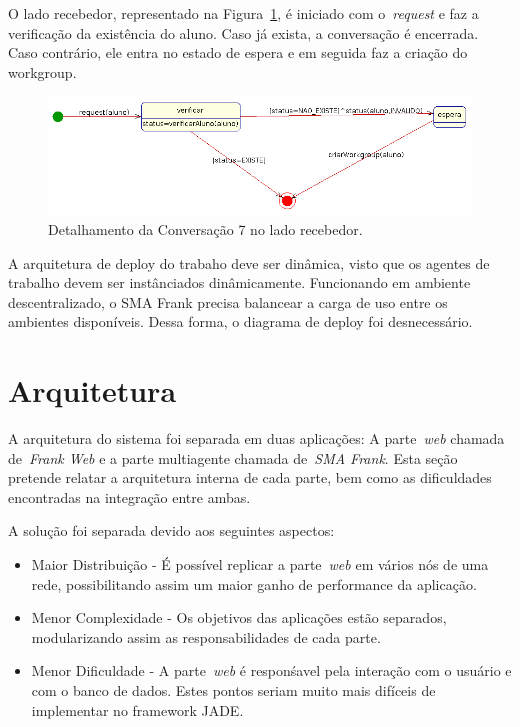 O lado recebedor, representado na Figura~\ref{fig:conv7-recebedor}, é iniciado com o~\emph{request} e faz a verificação da existência do aluno. Caso já exista, a conversação é encerrada. Caso contrário, ele entra no estado de espera e em seguida faz a criação do workgroup.
\begin{figure}
	\centering
	\includegraphics[scale=0.48]{images/conv7-recebedor.png}
	\caption{Detalhamento da Conversação 7 no lado recebedor.}
	\label{fig:conv7-recebedor}
\end{figure}

A arquitetura de deploy do trabaho deve ser dinâmica, visto que os agentes de trabalho devem ser instânciados dinâmicamente. Funcionando em ambiente descentralizado, o SMA Frank precisa balancear a carga de uso entre os ambientes disponíveis. Dessa forma, o diagrama de deploy foi desnecessário.

\section{Arquitetura}\label{section:arquitetura}

A arquitetura do sistema foi separada em duas aplicações: A parte~\emph{web} chamada de~\emph{Frank Web} e a parte multiagente chamada de~\emph{SMA Frank}. Esta seção pretende relatar a arquitetura interna de cada parte, bem como as dificuldades encontradas na integração entre ambas.

A solução foi separada devido aos seguintes aspectos:
\begin{itemize}
	\item Maior Distribuição - É possível replicar a parte~\emph{web} em vários nós de uma rede, possibilitando assim um maior ganho de performance da aplicação.
	\item Menor Complexidade - Os objetivos das aplicações estão separados, modularizando assim as responsabilidades de cada parte.
	\item Menor Dificuldade - A parte~\emph{web} é responśavel pela interação com o usuário e com o banco de dados. Estes pontos seriam muito mais difíceis de implementar no framework JADE.
\end{itemize}

